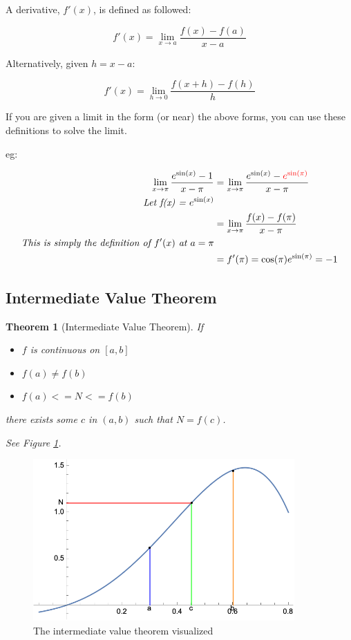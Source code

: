 \documentclass[12pt]{article}
\newtheorem{theorem}{Theorem}
\begin{document}
A derivative, $f'(x)$, is defined as followed:

$$f'(x) = \lim_{x\to a}\frac{f(x)-f(a)}{x-a}$$

Alternatively, given $h = x-a$:

$$f'(x) = \lim_{h\to 0} \frac{f(x+h)-f(h)}{h}$$

If you are given a limit in the form (or near) the above forms, you can use these definitions to solve the limit. 

eg: 

\begin{equation}
    \begin{split}
    \lim_{x\to \pi}\frac{e^{\sin(x)} - 1}{x - \pi} &= \lim_{x\to \pi}\frac{e^{\sin(x)} - \textcolor{red}{e^{\sin(\pi)}}}{x - \pi}\\
    \textit{Let f(x) = $e^{\sin(x)}$}\\
    &=\lim_{x\to \pi}\frac{f(x)-f(\pi)}{x - \pi}\\
    \textit{This is simply the definition of $f'(x)$ at $a=\pi$}\\
    &=f'(\pi) = \cos(\pi)e^{\sin(\pi)} = -1
    \end{split}
\end{equation}

\subsection{Intermediate Value Theorem}
\begin{theorem}[Intermediate Value Theorem]
    If
    \begin{itemize}
        \item $f$ is continuous on $[a,b]$
        \item $f(a) \neq f(b)$
        \item $f(a) <= N <= f(b)$
    \end{itemize}

    there exists some $c$ in $(a,b)$ such that $N = f(c)$.
    
    See Figure \ref{ivt}.
\end{theorem}
\begin{figure}[!ht]
    \centering
    \includegraphics[width=10.0cm]{misc/imvt.png}
    \caption{The intermediate value theorem visualized}
    \label{ivt}
\end{figure}
\end{document}
